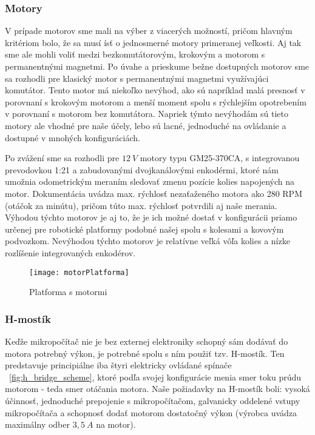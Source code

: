 \subsubsection{Motory}
V prípade motorov sme mali na výber z viacerých možností, pričom hlavným kritériom bolo, že sa musí ísť o jednosmerné motory primeranej veľkosti. Aj tak sme ale mohli voliť medzi bezkomutátorovým, krokovým a motorom s permanentnými magnetmi. Po úvahe a prieskume bežne dostupných motorov sme sa rozhodli pre klasický motor s permanentnými magnetmi využívajúci komutátor. Tento motor má niekoľko nevýhod, ako sú napríklad malá presnosť v porovnaní s krokovým motorom a menší moment spolu s rýchlejším opotrebením v porovnaní s motorom bez komutátora. Napriek týmto nevýhodám sú tieto motory ale vhodné pre naše účely, lebo sú lacné, jednoduché na ovládanie a dostupné v mnohých konfiguráciách. 

Po zvážení sme sa rozhodli pre $12~V$ motory typu GM25-370CA, s integrovanou prevodovkou 1:21 a zabudovanými dvojkanálovými enkodérmi, ktoré nám umožnia odometrickým meraním sledovať zmenu pozície kolies napojených na motor. Dokumentácia uvádza max. rýchlosť nezaťaženého motora ako 280 \ac{RPM} (otáčok za minútu), pričom túto max. rýchlosť potvrdili aj naše merania. Výhodou týchto motorov je aj to, že je ich možné dostať v konfigurácii priamo určenej pre robotické platformy podobné našej spolu s kolesami a kovovým podvozkom. Nevýhodou týchto motorov je relatívne veľká vôľa kolies a nízke rozlíšenie integrovaných enkodérov.  

\begin{figure}[h!]
\centering
\texttt{[image: motorPlatforma]}
\caption{Platforma s motormi\cite{wheelBase}}
\label{fig:motorPlatforma}
\end{figure}

\subsubsection{H-mostík}
Keďže mikropočítač nie je bez externej elektroniky schopný sám dodávať do motora potrebný výkon, je potrebné spolu s ním použiť tzv. H-mostík. Ten predstavuje principiálne iba štyri elektricky ovládané spínače \figurename~\ref{fig:h_bridge_scheme}, ktoré podľa svojej konfigurácie menia smer toku prúdu motorom - teda smer otáčania motora. Naše požiadavky na H-mostík boli: vysoká účinnosť, jednoduché prepojenie s mikropočítačom, galvanicky oddelené vstupy mikropočítača a schopnosť dodať motorom dostatočný výkon (výrobca uvádza maximálny odber $3,5~A$ na motor). 

